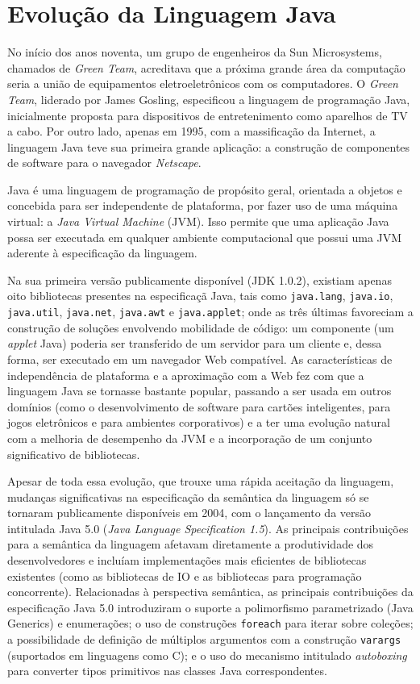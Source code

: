 \section{Evolução da Linguagem Java}\label{sec:evolucaoJava}
No início dos anos noventa, um grupo de engenheiros da Sun Microsystems, chamados de \textit{Green Team}, acreditava que a próxima grande área da computação seria a união de equipamentos eletroeletrônicos com os 
computadores. O \textit{Green Team}, liderado por James Gosling, especificou a linguagem de programação Java, 
inicialmente proposta para dispositivos de entretenimento como aparelhos de TV a cabo. Por outro lado, apenas em \num{1995}, com a massificação da Internet, a linguagem Java teve sua primeira grande aplicação: a construção de componentes de software para o navegador \textit{Netscape}.

Java é uma linguagem de programação de propósito geral, orientada a objetos e concebida para ser independente de plataforma, por fazer uso de uma máquina virtual: a \emph{Java Virtual Machine} (JVM). Isso permite que uma aplicação Java possa ser executada em qualquer ambiente computacional que possui uma JVM aderente à especificação da linguagem.

Na sua primeira versão publicamente disponível (\acs{JDK} 1.0.2), existiam apenas oito bibliotecas presentes na especificaçã Java, tais como \texttt{java.lang}, \texttt{java.io}, \texttt{java.util},  
\texttt{java.net}, \texttt{java.awt} e \texttt{java.applet}; onde as três últimas favoreciam a construção de soluções envolvendo mobilidade de código: um componente (um \textit{applet} Java) poderia ser transferido de um servidor para um cliente e, dessa forma, ser executado em um navegador Web compatível. As características de independência de plataforma e a aproximação com a Web fez com que a linguagem Java se tornasse bastante popular, passando a ser usada em outros domínios (como o desenvolvimento de software 
para cartões inteligentes, para jogos eletrônicos e para ambientes corporativos) e a ter uma evolução natural com a melhoria de desempenho da JVM e a incorporação de um conjunto significativo de  bibliotecas. 


Apesar de toda essa evolução, que trouxe uma rápida aceitação da linguagem, mudanças significativas na especificação da semântica da linguagem só se tornaram publicamente disponíveis em 2004, com o lançamento da versão intitulada Java 5.0 (\emph{Java Language Specification 1.5}). As principais contribuições para a semântica da linguagem afetavam diretamente a produtividade dos desenvolvedores e incluíam implementações mais eficientes de bibliotecas existentes (como as bibliotecas de IO e as bibliotecas para programação concorrente). Relacionadas à perspectiva semântica, as principais contribuições da especificação Java 5.0 introduziram o suporte a polimorfismo parametrizado (Java Generics) e enumerações; o uso de construções \texttt{foreach} para iterar sobre coleções; a possibilidade de definição de múltiplos argumentos com a construção \texttt{varargs} (suportados em linguagens como C); e o uso do mecanismo intitulado \emph{autoboxing} para converter tipos primitivos nas classes Java correspondentes. 

